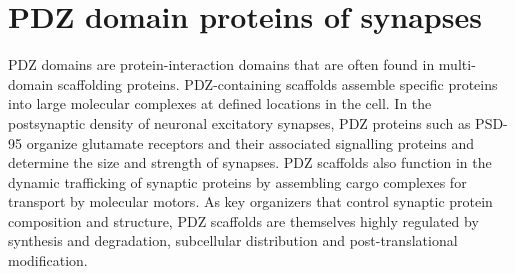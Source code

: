 \section{\cite{kim2004pdz} PDZ domain proteins of synapses}
PDZ domains are protein-interaction domains that are often found in multi-domain scaffolding proteins. PDZ-containing scaffolds assemble specific proteins into large molecular complexes at defined locations in the cell. In the postsynaptic density of neuronal excitatory synapses, PDZ proteins such as PSD-95 organize glutamate receptors and their associated signalling proteins and determine the size and strength of synapses. PDZ scaffolds also function in the dynamic trafficking of synaptic proteins by assembling cargo complexes for transport by molecular motors. As key organizers that control synaptic protein composition and structure, PDZ scaffolds are themselves highly regulated by synthesis and degradation, subcellular distribution and post-translational modification.